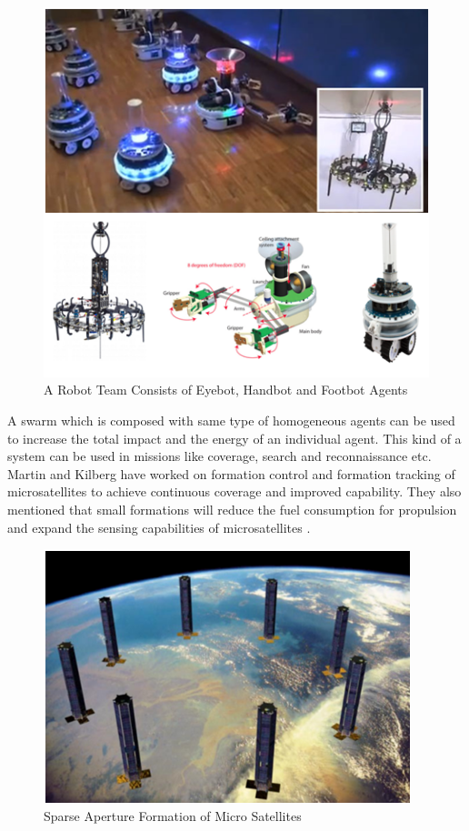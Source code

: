 \begin{figure}[H]
\caption{A Robot Team Consists of Eyebot, Handbot and Footbot Agents \cite{99}}
\centering
\includegraphics[scale = 1]{eyebot}
\end{figure} 

A swarm which is composed with same type of homogeneous agents can be used to increase the total impact and the energy of an individual agent. This kind of a system can be used in missions like coverage, search and  reconnaissance etc.  Martin and Kilberg have worked on formation control and formation tracking of  microsatellites to achieve continuous coverage and improved capability. They also mentioned that small formations will reduce the fuel consumption for propulsion and expand the sensing capabilities of microsatellites \cite{15}.

\begin{figure}[H]
\caption{Sparse Aperture Formation of Micro Satellites \cite{15}}
\centering
\includegraphics[scale = 1]{Satellite}
\end{figure} 

